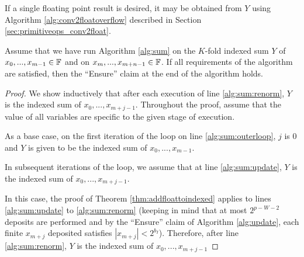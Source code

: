     If a single floating point result is desired, it may be obtained from $Y$ using Algorithm \ref{alg:conv2floatoverflow} described in Section \ref{sec:primitiveops_conv2float}.
    \begin{samepage}
    \begin{thm}
      Assume that we have run Algorithm \ref{alg:sum} on the $K$-fold indexed sum $Y$ of $x_0, ..., x_{m - 1} \in \mathbb{F}$ and on $x_m, ..., x_{m + n - 1} \in \mathbb{F}$. If all requirements of the algorithm are satisfied, then the ``Ensure'' claim at the end of the algorithm holds.
      \label{thm:sum}
    \end{thm}
    \end{samepage}
    \begin{proof}
      We show inductively that after each execution of line \ref{alg:sum:renorm}, $Y$ is the indexed sum of $x_0, ..., x_{m + j - 1}$. Throughout the proof, assume that the value of all variables are specific to the given stage of execution.

      As a base case, on the first iteration of the loop on line \ref{alg:sum:outerloop}, $j$ is 0 and $Y$ is given to be the indexed sum of $x_0, ..., x_{m - 1}$.

      In subsequent iterations of the loop, we assume that at line \ref{alg:sum:update}, $Y$ is the indexed sum of $x_0, ..., x_{m + j - 1}$.

      In this case, the proof of Theorem \ref{thm:addfloattoindexed} applies to lines \ref{alg:sum:update} to \ref{alg:sum:renorm} (keeping in mind that at most $2^{p - W - 2}$ deposits are performed and by the ``Ensure'' claim of Algorithm \ref{alg:update}, each finite $x_{m + j}$ deposited satisfies $|x_{m + j}| < 2^{b_I}$). Therefore, after line \ref{alg:sum:renorm}, $Y$ is the indexed sum of $x_0, ..., x_{m + j - 1}$

      \begin{comment}
        Therefore ${Y_k}_P \in [1.5  \epsilon^{-1} 2^{a_{I + k}}, 1.75  \epsilon^{-1} 2^{a_{I + k}})$ unless $I + k = 0$, in which case ${Y_0}_P \in (2^{e_{\max}}, 2 \cdot 2^{e_{\max}})$.


\end{comment}
\end{proof}
